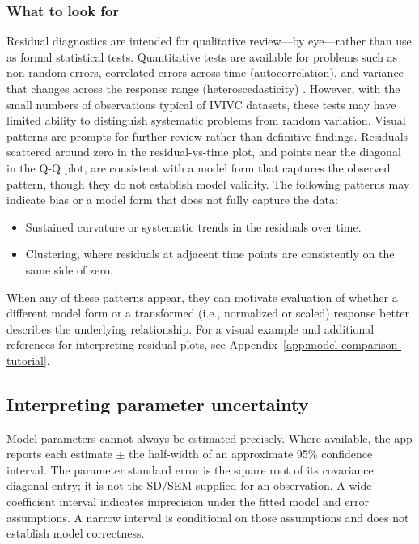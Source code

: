 \subsubsection*{What to look for}

Residual diagnostics are intended for qualitative review---by eye---rather than use as formal statistical tests. Quantitative tests are available for problems such as non-random errors, correlated errors across time (autocorrelation), and variance that changes across the response range (heteroscedasticity) \cite{kutner2005}. However, with the small numbers of observations typical of IVIVC datasets, these tests may have limited ability to distinguish systematic problems from random variation. Visual patterns are prompts for further review rather than definitive findings. Residuals scattered around zero in the residual-vs-time plot, and points near the diagonal in the Q-Q plot, are consistent with a model form that captures the observed pattern, though they do not establish model validity. The following patterns may indicate bias or a model form that does not fully capture the data:

\begin{itemize}
    \item Sustained curvature or systematic trends in the residuals over time.
    \item Clustering, where residuals at adjacent time points are consistently on the same side of zero.
\end{itemize}

When any of these patterns appear, they can motivate evaluation of whether a different model form or a transformed (i.e., normalized or scaled) response better describes the underlying relationship. For a visual example and additional references for interpreting residual plots, see Appendix~\ref{app:model-comparison-tutorial}. 


\subsection{Interpreting parameter uncertainty}

Model parameters cannot always be estimated precisely. Where available, the app reports each estimate $\pm$ the half-width of an approximate 95\% confidence interval. The parameter standard error is the square root of its covariance diagonal entry; it is not the SD/SEM supplied for an observation. A wide coefficient interval indicates imprecision under the fitted model and error assumptions. A narrow interval is conditional on those assumptions and does not establish model correctness.

